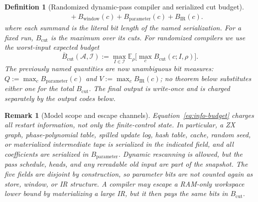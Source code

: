 \documentclass[aps,prx,reprint,floatfix,superscriptaddress]{revtex4-2}
\newtheorem{definition}{Definition}
\newtheorem{remark}{Remark}
\begin{document}
\begin{definition}[Randomized dynamic-pass compiler and serialized cut budget]
\begin{equation}
{\begin{aligned}
&\quad+B_{\mathrm{window}}(c)+B_{\mathrm{parameter}}(c)
      +B_{\mathrm{IR}}(c).
\end{aligned}}
\end{equation}
where each summand is the literal bit length of the named serialization.
For a fixed run, $B_{\mathrm{cut}}$ is the maximum over its cuts.  For
randomized compilers we use the worst-input expected budget
\begin{equation}
\label{eq:expected-cut}
 \overline B_{\mathrm{cut}}(\mathcal A,\mathcal I)
 :=\max_{I\in\mathcal I}\mathbb E_\rho
       \bigl[\max_c B_{\mathrm{cut}}(c;I,\rho)\bigr].
\end{equation}
The previously named quantities are now
unambiguous bit measures:
$Q:=\max_c B_{\mathrm{parameter}}(c)$ and
$V:=\max_c B_{\mathrm{IR}}(c)$; no theorem below substitutes either one
for the total $B_{\mathrm{cut}}$.  The final output is write-once and is
charged separately by the output codes below.
\end{definition}

\begin{remark}[Model scope and escape channels]
\label{rem:escape-channels}
Equation~\eqref{eq:info-budget} charges all restart information, not only
the finite-control state.  In particular, a ZX graph, phase-polynomial
table, spilled update log, hash table, cache, random seed, or materialized
intermediate tape is serialized in the indicated field, and all coefficients
are serialized in $B_{\mathrm{parameter}}$.  Dynamic rescanning is allowed,
but the pass schedule, heads, and any rereadable old input are part of the
snapshot.  The five fields are disjoint by construction, so parameter bits
are not counted again as store, window, or IR structure.  A compiler may
escape a RAM-only workspace lower bound by materializing a large IR, but it
then pays the same bits in $B_{\mathrm{cut}}$.
\end{remark}
\end{document}
